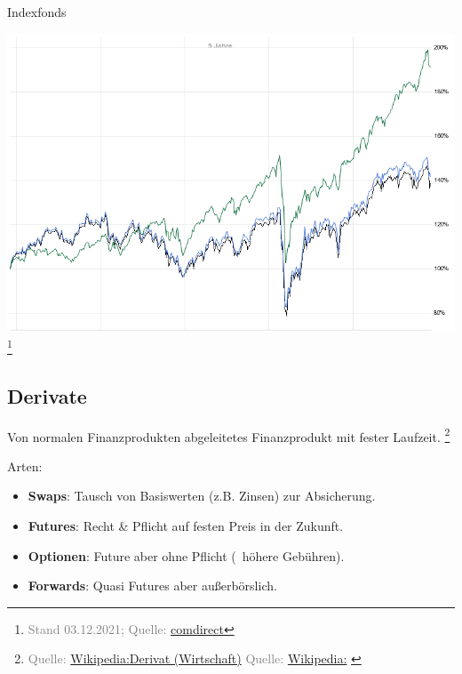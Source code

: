 \documentclass{beamer}
\let\oldfootnote\footnote
\renewcommand{\footnote}[1]
{%
	\oldfootnote
	{
		\tiny
		\textcolor{gray}{#1}
	}%
}
\newcommand{\citewiki}[2][]
{%
	\footnote
	{
		\ifthenelse{\isempty{#1}}
		{
			Quelle: \href{https://de.wikipedia.org/wiki/#2}{Wikipedia:#2}
		}
		{
			Quelle: \href{https://de.wikipedia.org/wiki/#2}{Wikipedia:#1}
		}
	}
}
\begin{document}
			\begin{frame}{Indexfonds}
				\begin{center}
					\includegraphics[height=0.8\textheight,trim=0 0 0 0.5cm]{images/dax-etf-benchmark}\footnote{Stand 03.12.2021; Quelle: \href{https://charts.comdirect.de/charts/benchmark_underlying.chart?HEIGHT=128&HEIGHT=600&ID_BENCH1=20735&ID_BENCH2=12221463&ID_NOTATION=28520649&TIME_SPAN=5Y&WIDTH=800}{comdirect}}
				\end{center}
			\end{frame}
		
		\subsection{Derivate}
		
			\begin{frame}
				\begin{definition}
					Von normalen Finanzprodukten abgeleitetes Finanzprodukt mit fester Laufzeit.\citewiki{Derivat (Wirtschaft)}
				\end{definition}
				Arten:
				\begin{itemize}
					\item \textbf{Swaps}: Tausch von Basiswerten (z.B. Zinsen) zur Absicherung.
					\item \textbf{Futures}: Recht \& Pflicht auf festen Preis in der Zukunft.
					\item \textbf{Optionen}: Future aber ohne Pflicht (\textrightarrow\ höhere Gebühren).
					\item \textbf{Forwards}: Quasi Futures aber außerbörslich.
				\end{itemize}
			\end{frame}
		
\end{document}
